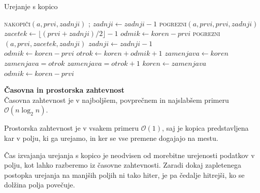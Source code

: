 \documentclass[a4paper,oneside,12pt]{article}
\newcommand{\subsubsubsection}[1]{\vspace*{1ex}\textbf{#1}\\}
\begin{document}
\begin{algorithm}[h!t!]
  \caption{Urejanje s kopico}\label{algo:heapsort}
  \begin{algorithmic}[1]
        \State \textsc{nakopiči}$(a, prvi, zadnji)$
            ;
            \State $zadnji \gets zadnji - 1$
            \State \textsc{pogrezni}$(a, prvi, prvi, zadnji)$
        \EndWhile
    \EndFunction
    \\
        \State $zacetek \gets \lfloor(prvi + zadnji) / 2\rfloor - 1$
         
            \State $odmik \gets koren - prvi$
            \State \textsc{pogrezni}$(a, prvi, zacetek, zadnji)$
            \State $zadnji \gets zadnji - 1$
        \EndWhile
    \EndFunction
    \\
        \State $odmik \gets koren - prvi$
         
            \State $otrok \gets koren + odmik + 1$
            \State $zamenjava \gets koren$ 
             
            \State $zamenjava = otrok$
            \EndIf {}
                \State $zamenjava = otrok + 1$
            \EndIf
                \State $koren \gets zamenjava$
                \State $odmik \gets koren - prvi$
            \Else
                \State \Return 
            \EndIf
        \EndWhile
    \EndFunction
  \end{algorithmic}
\end{algorithm}

\subsubsubsection{Časovna in prostorska zahtevnost}
Časovna zahtevnost je v najboljšem, povprečnem in najslabšem primeru $\mathcal{O}(n\log_2 n)$.

Prostorska zahtevnost je v vsakem primeru $\mathcal{O}(1)$, saj je kopica predstavljena kar v
polju, ki ga urejamo, in ker se vse premene dogajajo na mestu.

Čas izvajanja urejanja s kopico je neodvisen od morebitne urejenosti podatkov v polju,
kot lahko razberemo iz časovne zahtevnosti. Zaradi dokaj zapletenega postopka urejanja
na manjših poljih ni tako hiter, je pa čedalje hitrejši, ko se dolžina polja
povečuje.
\end{document}
